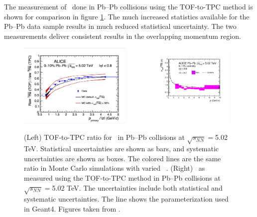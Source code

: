 The measurement of \sigmainel\ done in Pb--Pb collisions using the TOF-to-TPC method is shown for comparison in figure \ref{fig:Ahe_sigma_inel_PbPb}. The much increased statistics available for the Pb--Pb data sample results in much reduced statistical uncertainty. The two measurements deliver consistent results in the overlapping momentum region.

\begin{figure}
    \centering
    \includegraphics[width=0.48\textwidth]{figures/he3bar_TOF-to-TPC-ratio.png}
    \includegraphics[width=0.48\textwidth]{figures/Antihelium_inelastic_cross_section_PbPb.pdf}
    \caption{(Left) TOF-to-TPC ratio for \ahe\ in Pb--Pb collisions at $\sqrt{s_{NN}}=$5.02 TeV. Statistical uncertainties are shown as bars, and systematic uncertainties are shown as boxes. The colored lines are the same ratio in Monte Carlo simulations with varied \sigmainel\ . (Right) \sigmainel\ as measured using the TOF-to-TPC method in Pb--Pb collisions at $\sqrt{s_{NN}}=$5.02 TeV. The uncertainties include both statistical and systematic uncertainties. The line shows the parameterization used in Geant4. Figures taken from \cite{antiHe3XS}.}
    \label{fig:Ahe_sigma_inel_PbPb}
\end{figure}

